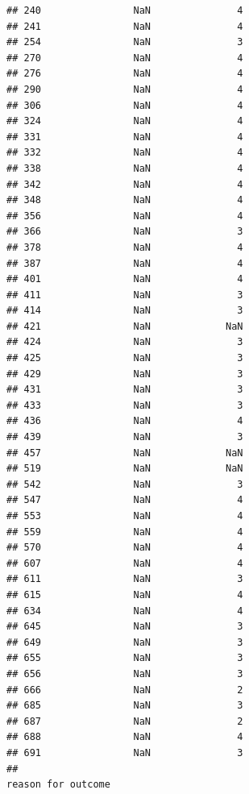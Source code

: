 \documentclass[
]{article}
\begin{document}
\begin{verbatim}
## 240                NaN               4
## 241                NaN               4
## 254                NaN               3
## 270                NaN               4
## 276                NaN               4
## 290                NaN               4
## 306                NaN               4
## 324                NaN               4
## 331                NaN               4
## 332                NaN               4
## 338                NaN               4
## 342                NaN               4
## 348                NaN               4
## 356                NaN               4
## 366                NaN               3
## 378                NaN               4
## 387                NaN               4
## 401                NaN               4
## 411                NaN               3
## 414                NaN               3
## 421                NaN             NaN
## 424                NaN               3
## 425                NaN               3
## 429                NaN               3
## 431                NaN               3
## 433                NaN               3
## 436                NaN               4
## 439                NaN               3
## 457                NaN             NaN
## 519                NaN             NaN
## 542                NaN               3
## 547                NaN               4
## 553                NaN               4
## 559                NaN               4
## 570                NaN               4
## 607                NaN               4
## 611                NaN               3
## 615                NaN               4
## 634                NaN               4
## 645                NaN               3
## 649                NaN               3
## 655                NaN               3
## 656                NaN               3
## 666                NaN               2
## 685                NaN               3
## 687                NaN               2
## 688                NaN               4
## 691                NaN               3
##                                                                                                                                                                                                                                                                                                                                                                                                                                                                                                                                                                                     reason for outcome

\end{verbatim}
\end{document}
